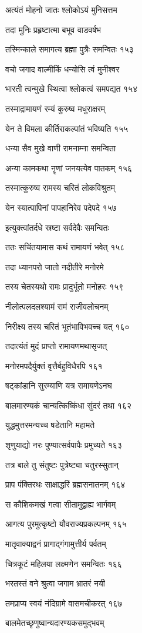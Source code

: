 अत्यंतं मोहनो जातः श्लोकोऽयं मुनिसत्तम

तदा मुनिः प्रहृष्टात्मा बभूव वाडवर्षभ

तस्मिन्काले समागत्य ब्रह्मा पुत्रैः समन्वितः १५३

वचो जगाद वाल्मीकिं धन्योसि त्वं मुनीश्वर

भारती त्वन्मुखे स्थित्वा श्लोकत्वं समपद्यत १५४

तस्माद्रामायणं रम्यं कुरुष्व मधुराक्षरम्

येन ते विमला कीर्तिराकल्पांतं भविष्यति १५५

धन्या सैव मुखे वाणी रामनाम्ना समन्विता

अन्या कामकथा नॄणां जनयत्येव पातकम् १५६

तस्मात्कुरुष्व रामस्य चरितं लोकविश्रुतम्

येन स्यात्पापिनां पापहानिरेव पदेपदे १५७

इत्युक्त्वांतर्दधे स्रष्टा सर्वदेवैः समन्वितः

ततः सचिंतयामास कथं रामायणं भवेत् १५८

तदा ध्यानपरो जातो नदीतीरे मनोरमे

तस्य चेतस्यथो रामः प्रादुर्भूतो मनोहरः १५९

नीलोत्पलदलश्यामं रामं राजीवलोचनम्

निरीक्ष्य तस्य चरितं भूतंभाविभवच्च यत् १६०

तदात्यंतं मुदं प्राप्तो रामायणमथासृजत्

मनोरमपदैर्युक्तं वृत्तैर्बहुविधैरपि १६१

षट्कांडानि सुरम्याणि यत्र रामायणेऽनघ

बालमारण्यकं चान्यत्किष्किंधा सुंदरं तथा १६२

युद्धमुत्तरमन्यच्च षडेतानि महामते

शृणुयाद्यो नरः पुण्यात्सर्वपापैः प्रमुच्यते १६३

तत्र बाले तु संतुष्टः पुत्रेष्ट्या चतुरस्सुतान्

प्राप पंक्तिरथः साक्षाद्धरिं ब्रह्मसनातनम् १६४

स कौशिकमखं गत्वा सीतामुद्वाह्य भार्गवम्

आगत्य पुरमुत्कृष्टो यौवराज्यप्रकल्पनम् १६५

मातृवाक्याद्वनं प्रागाद्गंगामुत्तीर्य पर्वतम्

चित्रकूटं महिलया लक्ष्मणेन समन्वितः १६६

भरतस्तं वने श्रुत्वा जगाम भ्रातरं नयी

तमप्राप्य स्वयं नंदिग्रामे वासमचीकरत् १६७

बालमेतच्छृणुष्वान्यदारण्यकसमुद्भवम्

